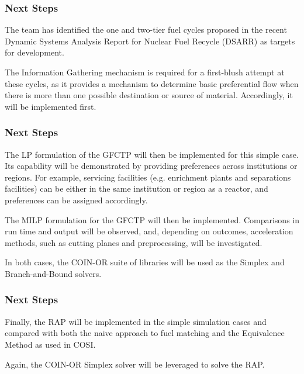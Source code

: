 \begin{frame}[ctb!]
  \frametitle{Next Steps} 
  
  The \Cyclus team has identified the one and two-tier fuel cycles proposed in
  the recent Dynamic Systems Analysis Report for Nuclear Fuel Recycle (DSARR)
  \cite{dixon_dynamic_2008} as targets for development.\vspace{0.2cm}

  The Information Gathering mechanism is required for a first-blush attempt at
  these cycles, as it provides a mechanism to determine basic preferential flow
  when there is more than one possible destination or source of
  material. Accordingly, it will be implemented first.\vspace{0.2cm}
\end{frame}

\begin{frame}[ctb!]
  \frametitle{Next Steps} 

  The LP formulation of the GFCTP will then be implemented for this simple
  case. Its capability will be demonstrated by providing preferences across
  institutions or regions. For example, servicing facilities (e.g. enrichment
  plants and separations facilities) can be either in the same institution or
  region as a reactor, and preferences can be assigned accordingly.

  \vspace{0.2cm}

  The MILP formulation for the GFCTP will then be implemented. Comparisons in
  run time and output will be observed, and, depending on outcomes, acceleration
  methods, such as cutting planes and preprocessing, will be investigated.
  
  \vspace{0.2cm}

  In both cases, the COIN-OR\cite{lougee_common_2003} suite of libraries will be
  used as the Simplex and Branch-and-Bound solvers.

\end{frame}

\begin{frame}[ctb!]
  \frametitle{Next Steps} 
  
  Finally, the RAP will be implemented in the simple simulation cases and
  compared with both the naive approach to fuel matching and the Equivalence
  Method as used in COSI. 

  \vspace{0.2cm}

  Again, the COIN-OR Simplex solver will be leveraged to solve the RAP.

\end{frame}
